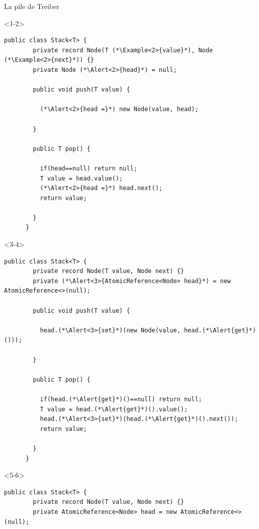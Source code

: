 
\begingroup

\begin{frame}[fragile]{La pile de Treiber}

  \vspace{10mm}
  \begin{onlyenv}<1-2>
    \begin{lstlisting}[gobble=6]
      public class Stack<T> {
        private record Node(T (*\Example<2>{value}*), Node (*\Example<2>{next}*)) {}
        private Node (*\Alert<2>{head}*) = null;
        
        public void push(T value) {
          
          (*\Alert<2>{head =}*) new Node(value, head);
          
        }
        
        public T pop() {
          
          if(head==null) return null;
          T value = head.value();
          (*\Alert<2>{head =}*) head.next();
          return value;
          
        }
      }
    \end{lstlisting}
  \end{onlyenv}
  \begin{onlyenv}<3-4>
    \begin{lstlisting}[gobble=6]
      public class Stack<T> {
        private record Node(T value, Node next) {}
        private (*\Alert<3>{AtomicReference<Node> head}*) = new AtomicReference<>(null);
        
        public void push(T value) {
          
          head.(*\Alert<3>{set}*)(new Node(value, head.(*\Alert{get}*)()));
          
        }
        
        public T pop() {
          
          if(head.(*\Alert{get}*)()==null) return null;
          T value = head.(*\Alert{get}*)().value();
          head.(*\Alert<3>{set}*)(head.(*\Alert{get}*)().next());
          return value;
          
        }
      }
    \end{lstlisting}
  \end{onlyenv}
  \begin{onlyenv}<5-6>
    \begin{lstlisting}[gobble=6]
      public class Stack<T> {
        private record Node(T value, Node next) {}
        private AtomicReference<Node> head = new AtomicReference<>(null);
        

\end{lstlisting}
\end{onlyenv}
\end{frame}
